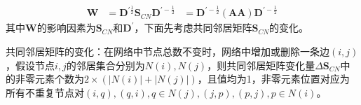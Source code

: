 \begin{equation}\label{defin:delta_w}
\begin{aligned}
\textbf{W} &= \textbf{D}^{\prime\frac{1}{2}}\textbf{S}_{CN}\textbf{D}^{\prime-\frac{1}{2}} 
&=\textbf{D}^{\prime-\frac{1}{2}}(\textbf{A}\textbf{A})\textbf{D}^{\prime-\frac{1}{2}}
\end{aligned}
\end{equation}
其中$\textbf{W}$的影响因素为$\textbf{S}_{CN}$和$\textbf{D}^{\prime}$，下面先考虑共同邻居矩阵$\textbf{S}_{CN}$的变化。
\begin{lemma}
	{共同邻居矩阵的变化}：在网络中节点总数不变时，网络中增加或删除一条边$(i,j)$，假设节点$i,j$的邻居集合分别为$N(i), N(j)$，则共同邻居矩阵变化量$\Delta\textbf{S}_{CN}$中的非零元素个数为$2\times(|N(i)| + |N(j)|)$，且值均为1，非零元素位置对应为所有不重复节点对$(i,q),(q,i), q\in N(j), (j,p),(p,j) ,p\in N(i)$。
\end{lemma}

